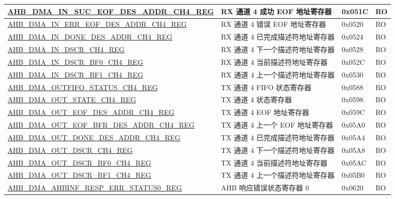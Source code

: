 \begin{longtable}{ | l | l | p{1.3cm} | l | }
\hyperref[regdesc:AHBDMAINSUCEOFDESADDRCHNREG]{AHB\_DMA\_IN\_SUC\_EOF\_DES\_ADDR\_CH4\_REG} & RX 通道 4 成功 EOF 地址寄存器 & 0x051C & RO    \\ \hline
\hyperref[regdesc:AHBDMAINERREOFDESADDRCHNREG]{AHB\_DMA\_IN\_ERR\_EOF\_DES\_ADDR\_CH4\_REG} & RX 通道 4 错误 EOF 地址寄存器 & 0x0520 & RO    \\ \hline
\hyperref[regdesc:AHBDMAINDONEDESADDRCHNREG]{AHB\_DMA\_IN\_DONE\_DES\_ADDR\_CH4\_REG} & RX 通道 4 已完成描述符地址寄存器 & 0x0524 & RO    \\ \hline
\hyperref[regdesc:AHBDMAINDSCRCHNREG]{AHB\_DMA\_IN\_DSCR\_CH4\_REG} & RX 通道 4 下一个描述符地址寄存器 & 0x0528 & RO    \\ \hline
\hyperref[regdesc:AHBDMAINDSCRBF0CHNREG]{AHB\_DMA\_IN\_DSCR\_BF0\_CH4\_REG} & RX 通道 4 当前描述符地址寄存器 & 0x052C & RO    \\ \hline
\hyperref[regdesc:AHBDMAINDSCRBF1CHNREG]{AHB\_DMA\_IN\_DSCR\_BF1\_CH4\_REG} & RX 通道 4 上一个描述符地址寄存器 & 0x0530 & RO    \\ \hline
\hyperref[regdesc:AHBDMAOUTFIFOSTATUSCHNREG]{AHB\_DMA\_OUTFIFO\_STATUS\_CH4\_REG} & TX 通道 4 FIFO 状态寄存器 & 0x0588 & RO    \\ \hline
\hyperref[regdesc:AHBDMAOUTSTATECHNREG]{AHB\_DMA\_OUT\_STATE\_CH4\_REG} & TX 通道 4 状态寄存器 & 0x0598 & RO    \\ \hline
\hyperref[regdesc:AHBDMAOUTEOFDESADDRCHNREG]{AHB\_DMA\_OUT\_EOF\_DES\_ADDR\_CH4\_REG} & TX 通道 4 EOF 地址寄存器 & 0x059C & RO    \\ \hline
\hyperref[regdesc:AHBDMAOUTEOFBFRDESADDRCHNREG]{AHB\_DMA\_OUT\_EOF\_BFR\_DES\_ADDR\_CH4\_REG} & TX 通道 4 上一个 EOF 地址寄存器 & 0x05A0 & RO    \\ \hline
\hyperref[regdesc:AHBDMAOUTDONEDESADDRCHNREG]{AHB\_DMA\_OUT\_DONE\_DES\_ADDR\_CH4\_REG} & TX 通道 4 已完成描述符地址寄存器 & 0x05A4 & RO    \\ \hline
\hyperref[regdesc:AHBDMAOUTDSCRCHNREG]{AHB\_DMA\_OUT\_DSCR\_CH4\_REG} & TX 通道 4 下一个描述符地址寄存器 & 0x05A8 & RO    \\ \hline
\hyperref[regdesc:AHBDMAOUTDSCRBF0CHNREG]{AHB\_DMA\_OUT\_DSCR\_BF0\_CH4\_REG} & TX 通道 4 当前描述符地址寄存器 & 0x05AC & RO    \\ \hline
\hyperref[regdesc:AHBDMAOUTDSCRBF1CHNREG]{AHB\_DMA\_OUT\_DSCR\_BF1\_CH4\_REG} & TX 通道 4 上一个描述符地址寄存器 & 0x05B0 & RO    \\ \hline
\hyperref[regdesc:AHBDMAAHBINFRESPERRSTATUS0REG]{AHB\_DMA\_AHBINF\_RESP\_ERR\_STATUS0\_REG} & AHB 响应错误状态寄存器 0 & 0x0620 & RO    \\ \hline

\end{longtable}
